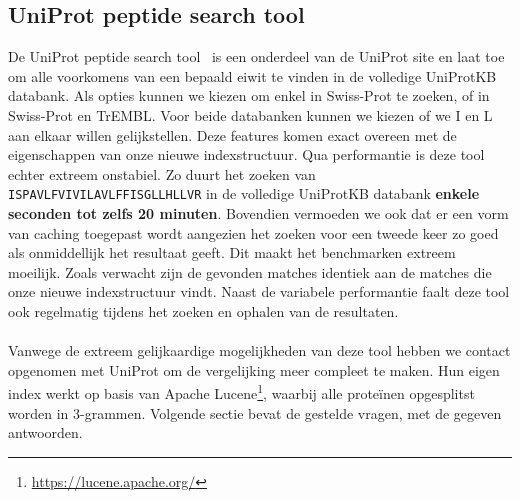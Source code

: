 \subsection{UniProt peptide search tool}
De UniProt peptide search tool~\cite{uniprot_search_paper, uniprot_search_site} is een onderdeel van de UniProt site en laat toe om alle voorkomens van een bepaald eiwit te vinden in de volledige UniProtKB databank.
Als opties kunnen we kiezen om enkel in Swiss-Prot te zoeken, of in Swiss-Prot en TrEMBL\@.
Voor beide databanken kunnen we kiezen of we I en L aan elkaar willen gelijkstellen.
Deze features komen exact overeen met de eigenschappen van onze nieuwe indexstructuur.
Qua performantie is deze tool echter extreem onstabiel.
Zo duurt het zoeken van \texttt{ISPAVLFVIVILAVLFFISGLLHLLVR} in de volledige UniProtKB databank \textbf{enkele seconden tot zelfs 20 minuten}.
Bovendien vermoeden we ook dat er een vorm van caching toegepast wordt aangezien het zoeken voor een tweede keer zo goed als onmiddellijk het resultaat geeft.
Dit maakt het benchmarken extreem moeilijk.
Zoals verwacht zijn de gevonden matches identiek aan de matches die onze nieuwe indexstructuur vindt.
Naast de variabele performantie faalt deze tool ook regelmatig tijdens het zoeken en ophalen van de resultaten.
\\ \\
Vanwege de extreem gelijkaardige mogelijkheden van deze tool hebben we contact opgenomen met UniProt om de vergelijking meer compleet te maken.
Hun eigen index werkt op basis van Apache Lucene\footnote{\url{https://lucene.apache.org/}}, waarbij alle proteïnen opgesplitst worden in 3-grammen.
Volgende sectie bevat de gestelde vragen, met de gegeven antwoorden.

